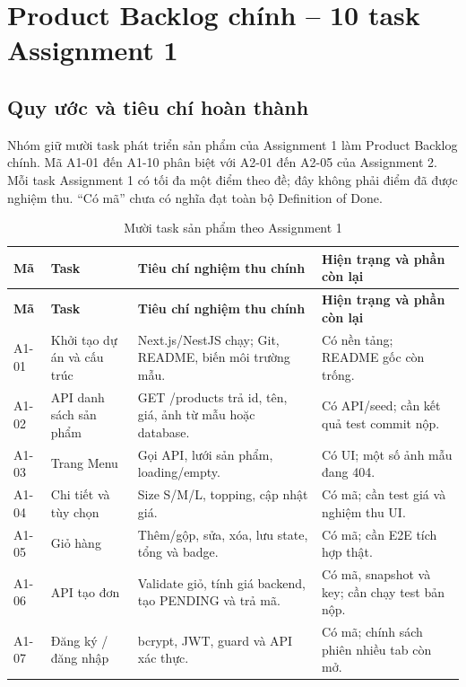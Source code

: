 \section{Product Backlog chính -- 10 task Assignment 1}
\subsection{Quy ước và tiêu chí hoàn thành}
Nhóm giữ mười task phát triển sản phẩm của Assignment 1 làm Product Backlog chính. Mã A1-01 đến A1-10 phân biệt với A2-01 đến A2-05 của Assignment 2. Mỗi task Assignment 1 có tối đa một điểm theo đề; đây không phải điểm đã được nghiệm thu. ``Có mã'' chưa có nghĩa đạt toàn bộ Definition of Done.

\begingroup\footnotesize\setlength{\tabcolsep}{3pt}
\begin{longtable}{|>{\raggedright\arraybackslash}p{}|>{\raggedright\arraybackslash}p{}|>{\raggedright\arraybackslash}p{}|>{\raggedright\arraybackslash}p{}|}
\caption{Mười task sản phẩm theo Assignment 1}\\\hline
\textbf{Mã} & \textbf{Task} & \textbf{Tiêu chí nghiệm thu chính} & \textbf{Hiện trạng và phần còn lại}\\\hline
\endfirsthead
\hline\textbf{Mã} & \textbf{Task} & \textbf{Tiêu chí nghiệm thu chính} & \textbf{Hiện trạng và phần còn lại}\\\hline
\endhead
A1-01 & Khởi tạo dự án và cấu trúc & Next.js/NestJS chạy; Git, README, biến môi trường mẫu. & Có nền tảng; README gốc còn trống.\\\hline
A1-02 & API danh sách sản phẩm & GET /products trả id, tên, giá, ảnh từ mẫu hoặc database. & Có API/seed; cần kết quả test commit nộp.\\\hline
A1-03 & Trang Menu & Gọi API, lưới sản phẩm, loading/empty. & Có UI; một số ảnh mẫu đang 404.\\\hline
A1-04 & Chi tiết và tùy chọn & Size S/M/L, topping, cập nhật giá. & Có mã; cần test giá và nghiệm thu UI.\\\hline
A1-05 & Giỏ hàng & Thêm/gộp, sửa, xóa, lưu state, tổng và badge. & Có mã; cần E2E tích hợp thật.\\\hline
A1-06 & API tạo đơn & Validate giỏ, tính giá backend, tạo PENDING và trả mã. & Có mã, snapshot và key; cần chạy test bản nộp.\\\hline
A1-07 & Đăng ký / đăng nhập & bcrypt, JWT, guard và API xác thực. & Có mã; chính sách phiên nhiều tab còn mở.\\\hline

\end{longtable}
